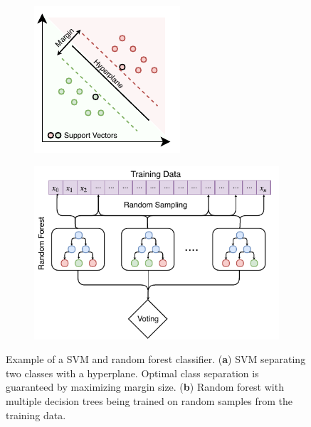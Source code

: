 \begin{figure}[h]
\centering
   \begin{subfigure}[b]{0.40\textwidth}
   \includegraphics[trim={0cm 0cm 0cm 0cm},clip,width=.90\linewidth]{chapter_4_roofshape/imgs/svm_no_kernel.pdf}
   \caption{}
   \label{fig:svm_vis} 
\end{subfigure}
\begin{subfigure}[b]{.50\columnwidth}
   \includegraphics[trim={0.1cm 0cm 0cm 0.5cm},clip,width=.99\linewidth]{chapter_4_roofshape/imgs/random_forest_vis.pdf}
   \caption{}
   \label{fig:random_forest_vis}
\end{subfigure}
\vspace{-12pt}

\caption[Example of a SVM and random forest classifier.]{Example of a SVM and random forest classifier. (\textbf{a}) SVM separating two classes with a hyperplane. Optimal class separation is guaranteed by maximizing margin size. (\textbf{b}) Random forest with multiple decision trees being trained on random samples from the training data. }
\label{fig:vis_classical}
\end{figure}


